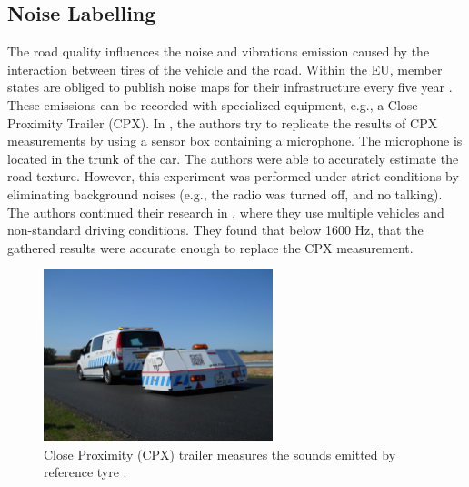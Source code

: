 \subsection{Noise Labelling}
The road quality influences the noise and vibrations emission caused by the interaction between tires of the vehicle and the road. Within the EU, member states are obliged to publish noise maps for their infrastructure every five year \cite{EU2002}. These emissions can be recorded with specialized equipment, e.g., a Close Proximity Trailer (CPX). In , the authors try to replicate the results of CPX measurements by using a sensor box containing a microphone. The microphone is located in the trunk of the car. The authors were able to accurately estimate the road texture. However, this experiment was performed under strict conditions by eliminating background noises (e.g., the radio was turned off, and no talking). The authors continued their research in , where they use multiple vehicles and non-standard driving conditions. They found that below 1600 Hz, that the gathered results were accurate enough to replace the CPX measurement.

\begin{figure}[ht]
\begin{center}
\includegraphics[height=5cm,keepaspectratio]{images/2_literature/cpx-trailer.jpg}
\end{center}
\caption{Close Proximity (CPX) trailer measures the sounds emitted by reference tyre \cite{MP2020}.}
\end{figure}


